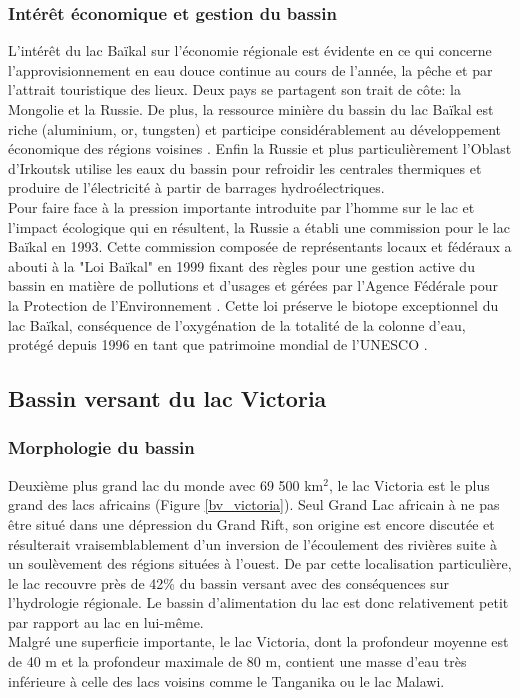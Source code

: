 \subsubsection*{{\selectfont Intérêt économique et gestion du bassin}}

L'intérêt du lac Baïkal sur l'économie régionale est évidente en ce qui concerne l'approvisionnement en eau douce continue au cours de l'année, la pêche et par l'attrait touristique des lieux. Deux pays se partagent son trait de côte: la Mongolie et la Russie. De plus, la ressource minière du bassin du lac Baïkal est riche  (aluminium, or, tungsten) et participe considérablement au développement économique des régions voisines \citep{brunello2003}. Enfin la Russie et plus particulièrement l'Oblast d'Irkoutsk utilise les eaux du bassin pour refroidir les centrales thermiques et produire de l'électricité à partir de barrages hydroélectriques.\\

Pour faire face à la pression importante introduite par l'homme sur le lac et l'impact écologique qui en résultent, la Russie a établi une commission pour le lac Baïkal en 1993. Cette commission composée de représentants locaux et fédéraux a abouti à la "Loi Baïkal" en 1999 fixant des règles pour une gestion active du bassin en matière de pollutions et d'usages et gérées par l'Agence Fédérale pour la Protection de l'Environnement \citep{garmaeva2001,brunello2006}. Cette loi préserve le biotope exceptionnel du lac Baïkal, conséquence de l'oxygénation de la totalité de la colonne d'eau, protégé depuis 1996 en tant que patrimoine mondial de l'UNESCO \citep{moore2009}.  

\subsection{{\selectfont Bassin versant du lac Victoria}}
\label{sec:victoria}
\subsubsection*{{\selectfont Morphologie du bassin}}

Deuxième plus grand lac du monde avec 69 500 km$^{2}$, le lac Victoria est le plus grand des lacs africains (Figure \ref{bv_victoria}). Seul Grand Lac africain à ne pas être situé dans une dépression du Grand Rift, son origine est encore discutée et résulterait vraisemblablement d'un inversion de l'écoulement des rivières suite à un soulèvement des régions situées à l'ouest. De par cette localisation particulière, le lac recouvre près de 42\% du bassin versant avec des conséquences sur l'hydrologie régionale. Le bassin d'alimentation du lac est donc relativement petit par rapport au lac en lui-même.\\
Malgré une superficie importante, le lac Victoria, dont la profondeur moyenne est de 40 m et la profondeur maximale de 80 m, contient une masse d'eau très inférieure à celle des lacs voisins comme le Tanganika ou le lac Malawi.\\

